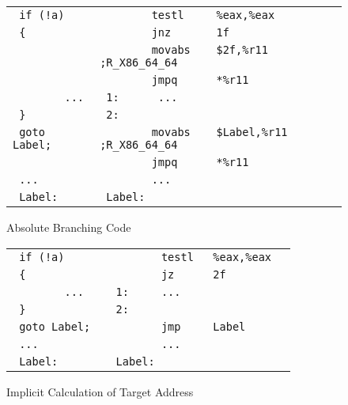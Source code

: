 \begin{figure}[H]
\Hrule
\caption{Absolute Branching Code}\label{large_abs_branching}
\begin{footnotesize}
\begin{tabular}{|l|l|}
\hline
\verb# if (!a)     # & \verb#        testl     %eax,%eax   # \\
\verb# {           # & \verb#        jnz       1f          # \\
\verb#             # & \verb#        movabs    $2f,%r11    ;R_X86_64_64 # \\
\verb#             # & \verb#        jmpq      *%r11       # \\
\verb#        ...  # & \verb# 1:      ...                  # \\
\verb# }           # & \verb# 2:                           # \\
\hline
\verb# goto Label; # & \verb#        movabs    $Label,%r11 ;R_X86_64_64 # \\
\verb#             # & \verb#        jmpq      *%r11       # \\
\verb# ...         # & \verb#        ...                   # \\
\verb# Label:      # & \verb# Label:                       # \\
\hline
\end{tabular}
\end{footnotesize}
\end{figure}

\begin{figure}[H]
\Hrule
\caption{Implicit Calculation of Target Address}\label{large_cal_tgt_addr}
\begin{footnotesize}
\begin{tabular}{|l|l|}
\hline
\verb# if (!a)     # & \verb#        testl   %eax,%eax  # \\
\verb# {           # & \verb#        jz      2f         # \\
\verb#        ...  # & \verb# 1:     ...                # \\
\verb# }           # & \verb# 2:                        # \\
\hline
\verb# goto Label; # & \verb#        jmp     Label      # \\
\verb# ...         # & \verb#        ...                # \\
\verb# Label:      # & \verb# Label:                    # \\
\hline
\end{tabular}
\end{footnotesize}
\end{figure}

